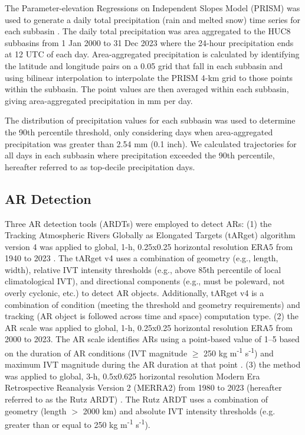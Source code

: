 \documentclass[draft]{agujournal2019}
\begin{document}
The Parameter-elevation Regressions on Independent Slopes Model (PRISM) was used to generate a daily total precipitation (rain and melted snow) time series for each subbasin \cite{Daly2008PhysiographicallyStates}. The daily total precipitation was area aggregated to the HUC8 subbasins from 1 Jan 2000 to 31 Dec 2023 where the 24-hour precipitation ends at 12 UTC of each day. Area-aggregated precipitation is calculated by identifying the latitude and longitude pairs on a 0.05\textdegree{} grid that fall in each subbasin and using bilinear interpolation to interpolate the PRISM 4-km grid to those points within the subbasin. The point values are then averaged within each subbasin, giving area-aggregated precipitation in mm per day. 


The distribution of precipitation values for each subbasin was used to determine the 90th percentile threshold, only considering days when area-aggregated precipitation was greater than 2.54 mm (0.1 inch). We calculated trajectories for all days in each subbasin where precipitation exceeded the 90th percentile, hereafter referred to as top-decile precipitation days.


\subsection{AR Detection}

Three AR detection tools (ARDTs) were employed to detect ARs: (1) the Tracking Atmospheric Rivers Globally as Elongated Targets (tARget) algorithm version 4 was applied to global, 1-h, 0.25\textdegree{}x0.25\textdegree{} horizontal resolution ERA5 from 1940 to 2023 \cite{Guan2024AERA5}. The tARget v4 uses a combination of geometry (e.g., length, width), relative IVT intensity thresholds (e.g., above 85th percentile of local climatological IVT), and directional components (e.g., must be poleward, not overly cyclonic, etc.) to detect AR objects. Additionally, tARget v4 is a combination of condition (meeting the threshold and geometry requirements) and tracking (AR object is followed across time and space) computation type. (2) the AR scale \cite{MartinRalph2019} was applied to global, 1-h, 0.25\textdegree{}x0.25\textdegree{} horizontal resolution ERA5 from 2000 to 2023. The AR scale identifies ARs using a point-based value of 1--5 based on the duration of AR conditions (IVT magnitude $\geq$ 250 kg m\textsuperscript{-1} s\textsuperscript{-1}) and maximum IVT magnitude during the AR duration at that point \cite{MartinRalph2019}. (3) the  method was applied to global, 3-h, 0.5\textdegree{}x0.625\textdegree{} horizontal resolution Modern Era Retrospective Reanalysis Version 2 (MERRA2) from 1980 to 2023 (hereafter referred to as the Rutz ARDT) \cite{Bosilovich2015, Gelaro2017}. The Rutz ARDT uses a combination of geometry (length $>$ 2000 km) and absolute IVT intensity thresholds (e.g. greater than or equal to 250 kg m\textsuperscript{-1} s\textsuperscript{-1}).
\end{document}
